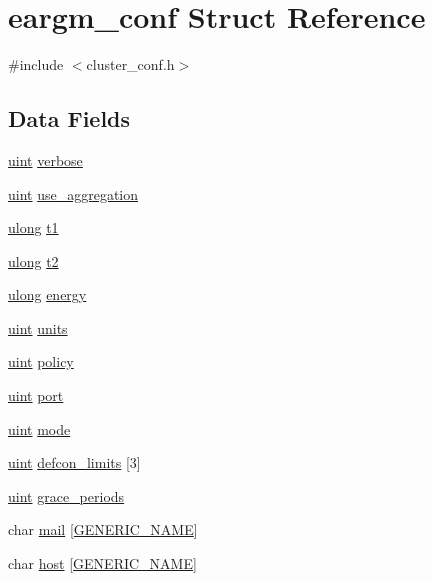 \hypertarget{structeargm__conf}{}\section{eargm\+\_\+conf Struct Reference}
\label{structeargm__conf}


{\ttfamily \#include $<$cluster\+\_\+conf.\+h$>$}

\subsection*{Data Fields}
\begin{DoxyCompactItemize}
\item 
\hyperlink{generic_8h_a91ad9478d81a7aaf2593e8d9c3d06a14}{uint} \hyperlink{structeargm__conf_a36bcc8aa5b1f1367ff001518149a789f}{verbose}
\item 
\hyperlink{generic_8h_a91ad9478d81a7aaf2593e8d9c3d06a14}{uint} \hyperlink{structeargm__conf_ae7a047cf5c87ba13ea283afd17ca9a54}{use\+\_\+aggregation}
\item 
\hyperlink{generic_8h_a718b4eb2652c286f4d42dc18a8e71a1a}{ulong} \hyperlink{structeargm__conf_ac6da327bd1d1a48c38860ef4eb1d94f6}{t1}
\item 
\hyperlink{generic_8h_a718b4eb2652c286f4d42dc18a8e71a1a}{ulong} \hyperlink{structeargm__conf_aaa8c95724df6bffde492a8519e79d230}{t2}
\item 
\hyperlink{generic_8h_a718b4eb2652c286f4d42dc18a8e71a1a}{ulong} \hyperlink{structeargm__conf_a8a95ddc3dd089a447714e2828155f5f3}{energy}
\item 
\hyperlink{generic_8h_a91ad9478d81a7aaf2593e8d9c3d06a14}{uint} \hyperlink{structeargm__conf_a03716673397e97334c320454b2e37016}{units}
\item 
\hyperlink{generic_8h_a91ad9478d81a7aaf2593e8d9c3d06a14}{uint} \hyperlink{structeargm__conf_a14f8bedf2d28594a9636993d4b33f01b}{policy}
\item 
\hyperlink{generic_8h_a91ad9478d81a7aaf2593e8d9c3d06a14}{uint} \hyperlink{structeargm__conf_a4ef8b32b98933c0ca007367ef5a0732a}{port}
\item 
\hyperlink{generic_8h_a91ad9478d81a7aaf2593e8d9c3d06a14}{uint} \hyperlink{structeargm__conf_a6ac8156dbf0983841e5c51ee92a12ade}{mode}
\item 
\hyperlink{generic_8h_a91ad9478d81a7aaf2593e8d9c3d06a14}{uint} \hyperlink{structeargm__conf_a52fa8e2922a072dc2b577a9e14a02284}{defcon\+\_\+limits} \mbox{[}3\mbox{]}
\item 
\hyperlink{generic_8h_a91ad9478d81a7aaf2593e8d9c3d06a14}{uint} \hyperlink{structeargm__conf_a343e48b700356d9c363ee2aa7399e58c}{grace\+\_\+periods}
\item 
char \hyperlink{structeargm__conf_a32b7ae376a295a99842245f8e571f145}{mail} \mbox{[}\hyperlink{loop_8h_a6b0b8b14cfc75447be8feba3efe18da8}{G\+E\+N\+E\+R\+I\+C\+\_\+\+N\+A\+ME}\mbox{]}
\item 
char \hyperlink{structeargm__conf_a35efd5e16a99666d3cd1471b696d2845}{host} \mbox{[}\hyperlink{loop_8h_a6b0b8b14cfc75447be8feba3efe18da8}{G\+E\+N\+E\+R\+I\+C\+\_\+\+N\+A\+ME}\mbox{]}
\end{DoxyCompactItemize}


